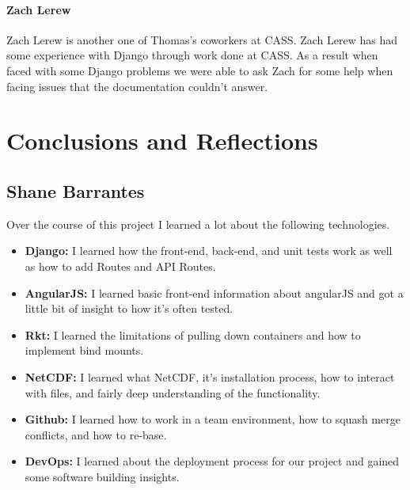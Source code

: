 \documentclass[onecolumn, draftclsnofoot,10pt, compsoc]{article}
\begin{document}
            \paragraph{Zach Lerew} Zach Lerew is another one of Thomas's coworkers at CASS. Zach Lerew has had some experience with Django through work done at CASS. As a result when faced with some Django problems we were able to ask Zach for some help when facing issues that the documentation couldn't answer.\\
    

\section{Conclusions and Reflections}

    \subsection{Shane Barrantes}
        Over the course of this project I learned a lot about the following technologies.
        \begin{itemize}
            \item \textbf{Django:} I learned how the front-end, back-end, and unit tests work as well as how to add Routes and API Routes.
            \item \textbf{AngularJS:} I learned basic front-end information about angularJS and got a little bit of insight to how it's often tested.
            \item \textbf{Rkt:} I learned the limitations of pulling down containers and how to implement bind mounts.
            \item \textbf{NetCDF:} I learned what NetCDF, it's installation process, how to interact with files, and fairly deep understanding of the functionality.
            \item \textbf{Github:} I learned how to work in a team environment, how to squash merge conflicts, and how to re-base.
            \item \textbf{DevOps:} I learned about the deployment process for our project and gained some software building insights.
        \end{itemize}
        
\end{document}
